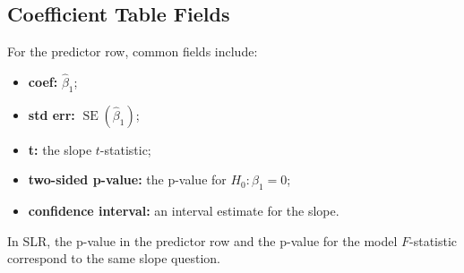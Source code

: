\subsection{Coefficient Table Fields}

For the predictor row, common fields include:
\begin{itemize}
  \item \textbf{coef:} $\widehat{\beta}_1$;
  \item \textbf{std err:} $\operatorname{SE}(\widehat{\beta}_1)$;
  \item \textbf{t:} the slope $t$-statistic;
  \item \textbf{two-sided p-value:} the p-value for $H_0:\beta_1=0$;
  \item \textbf{confidence interval:} an interval estimate for the slope.
\end{itemize}

In SLR, the p-value in the predictor row and the p-value for the model $F$-statistic correspond to the same slope question.

